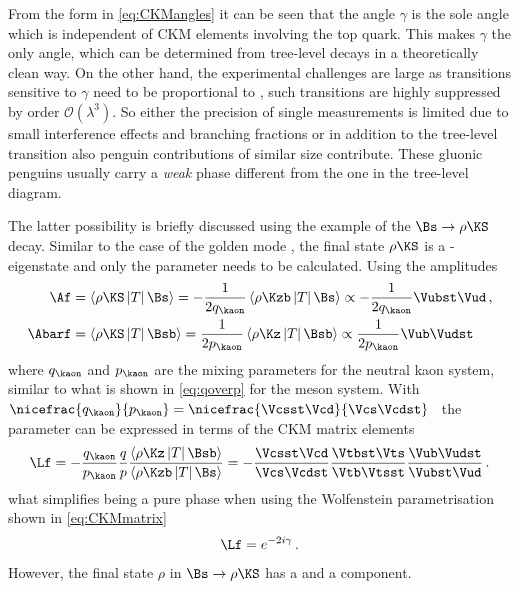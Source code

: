 From the form in \cref{eq:CKMangles} it can be seen that the angle $\gamma$ is the sole angle which is independent of CKM elements involving the top quark.
This makes $\gamma$ the only angle, which can be determined from tree-level decays in a theoretically clean way.
On the other hand, the experimental challenges are large as transitions sensitive to $\gamma$ need to be proportional to \Vub, \ie such transitions are highly suppressed by order $\mathcal{O}\!\left(\lambda^3\right)$.
So either the precision of single measurements is limited due to small interference effects and branching fractions or in addition to the tree-level transition also penguin contributions of similar size contribute.
These gluonic penguins usually carry a \emph{weak} phase different from the one in the tree-level diagram.

The latter possibility is briefly discussed using the example of the $\Bs\to\rho\KS$ decay.
Similar to the case of the golden mode \BdToJPsiKS, the final state $\rho\KS$ is a \CP-eigenstate and only the parameter \Lf needs to be calculated.
Using the amplitudes
\begin{equation}
\begin{aligned}
\Af&=\left<\rho\KS\left|T\right|\Bs\right>=-\frac{1}{2q_{\kaon}}\left<\rho\Kzb\left|T\right|\Bs\right>\propto-\frac{1}{2q_{\kaon}}\Vubst\Vud\,,\\
\Abarf&=\left<\rho\KS\left|T\right|\Bsb\right>=\frac{1}{2p_{\kaon}}\left<\rho\Kz\left|T\right|\Bsb\right>\propto\frac{1}{2p_{\kaon}}\Vub\Vudst
\end{aligned}
\end{equation}
where $q_{\kaon}$ and $p_{\kaon}$ are the mixing parameters for the neutral kaon system, similar to what is shown in \cref{eq:qoverp} for the \Bz meson system.
With $\nicefrac{q_{\kaon}}{p_{\kaon}}=\nicefrac{\Vcsst\Vcd}{\Vcs\Vcdst}$~\cite{Branco:396964} the parameter \Lf can be expressed in terms of the CKM matrix elements
\begin{equation}
\Lf=-\frac{q_{\kaon}}{p_{\kaon}}\frac{q}{p}\frac{\left<\rho\Kz\left|T\right|\Bsb\right>}{\left<\rho\Kzb\left|T\right|\Bs\right>}
=-\frac{\Vcsst\Vcd}{\Vcs\Vcdst}\frac{\Vtbst\Vts}{\Vtb\Vtsst}\frac{\Vub\Vudst}{\Vubst\Vud}\,.
\end{equation}
what simplifies \Lf being a pure phase when using the Wolfenstein parametrisation shown in \cref{eq:CKMmatrix}
\begin{equation}
\Lf=e^{-2i\gamma}\,.
\end{equation}
However, the final state $\rho$ in $\Bs\to\rho\KS$ has a \uquark\uquarkbar and a \dquark\dquarkbar component.
